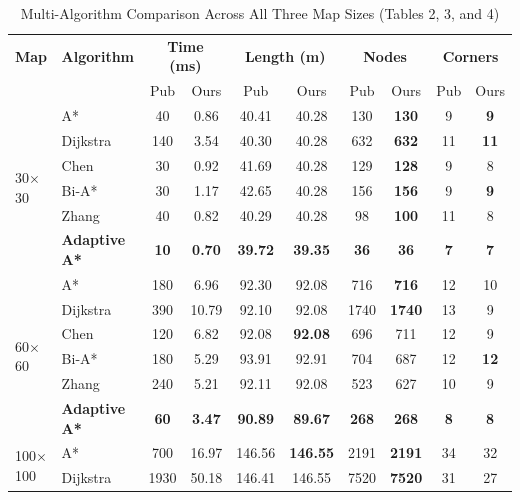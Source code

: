 \documentclass[conference]{IEEEtran}
\begin{document}
\begin{enumerate}
\begin{table}[htbp]
\caption{Multi-Algorithm Comparison Across All Three Map Sizes (Tables 2, 3, and 4)}
\label{tab:multi}
\centering
\scriptsize
\setlength{\tabcolsep}{2.8pt}
\begin{tabular}{llcccccccc}
\toprule
\textbf{Map} & \textbf{Algorithm} & \multicolumn{2}{c}{\textbf{Time (ms)}} & \multicolumn{2}{c}{\textbf{Length (m)}} & \multicolumn{2}{c}{\textbf{Nodes}} & \multicolumn{2}{c}{\textbf{Corners}} \\
 & & Pub & Ours & Pub & Ours & Pub & Ours & Pub & Ours \\
\midrule
\multirow{6}{*}{30$\times$30}
 & A* & 40 & 0.86 & 40.41 & 40.28 & 130 & \textbf{130} & 9 & \textbf{9} \\
 & Dijkstra \cite{dijkstra1959note} & 140 & 3.54 & 40.30 & 40.28 & 632 & \textbf{632} & 11 & \textbf{11} \\
 & Chen \cite{chen2023improved} & 30 & 0.92 & 41.69 & 40.28 & 129 & \textbf{128} & 9 & 8 \\
 & Bi-A* \cite{xu2024hybrid} & 30 & 1.17 & 42.65 & 40.28 & 156 & \textbf{156} & 9 & \textbf{9} \\
 & Zhang \cite{zhang2023global} & 40 & 0.82 & 40.29 & 40.28 & 98 & \textbf{100} & 11 & 8 \\
 & \textbf{Adaptive A*} & \textbf{10} & \textbf{0.70} & \textbf{39.72} & \textbf{39.35} & \textbf{36} & \textbf{36} & \textbf{7} & \textbf{7} \\
\midrule
\multirow{6}{*}{60$\times$60}
 & A* & 180 & 6.96 & 92.30 & 92.08 & 716 & \textbf{716} & 12 & 10 \\
 & Dijkstra \cite{dijkstra1959note} & 390 & 10.79 & 92.10 & 92.08 & 1740 & \textbf{1740} & 13 & 9 \\
 & Chen \cite{chen2023improved} & 120 & 6.82 & 92.08 & \textbf{92.08} & 696 & 711 & 12 & 9 \\
 & Bi-A* \cite{xu2024hybrid} & 180 & 5.29 & 93.91 & 92.91 & 704 & 687 & 12 & \textbf{12} \\
 & Zhang \cite{zhang2023global} & 240 & 5.21 & 92.11 & 92.08 & 523 & 627 & 10 & 9 \\
 & \textbf{Adaptive A*} & \textbf{60} & \textbf{3.47} & \textbf{90.89} & \textbf{89.67} & \textbf{268} & \textbf{268} & \textbf{8} & \textbf{8} \\
\midrule
\multirow{6}{*}{100$\times$100}
 & A* & 700 & 16.97 & 146.56 & \textbf{146.55} & 2191 & \textbf{2191} & 34 & 32 \\
 & Dijkstra \cite{dijkstra1959note} & 1930 & 50.18 & 146.41 & 146.55 & 7520 & \textbf{7520} & 31 & 27 \\

\end{tabular}
\end{table}
\end{enumerate}
\end{document}
